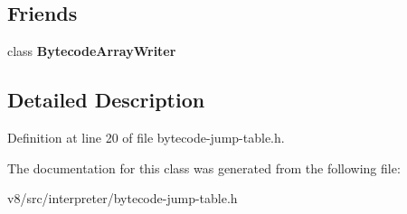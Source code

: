 \subsection*{Friends}
\begin{DoxyCompactItemize}
\item 
\mbox{\label{classv8_1_1internal_1_1interpreter_1_1BytecodeJumpTable_aab2e7c63f9c786abf0fed26deb945c2c}} 
class {\bfseries Bytecode\+Array\+Writer}
\end{DoxyCompactItemize}


\subsection{Detailed Description}


Definition at line 20 of file bytecode-\/jump-\/table.\+h.



The documentation for this class was generated from the following file\+:\begin{DoxyCompactItemize}
\item 
v8/src/interpreter/bytecode-\/jump-\/table.\+h\end{DoxyCompactItemize}
